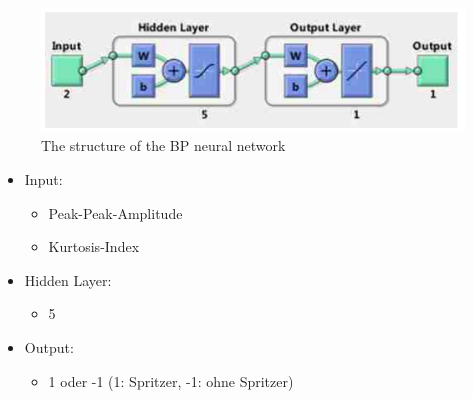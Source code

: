 \documentclass[english,ngerman]{tudscrreprt}
\begin{document}
\begin{figure}[H]
\centering
\includegraphics[scale = 0.8]{./Bilder/The structure of the BP neural network.png}
\caption{The structure of the BP neural network}\label{fgg:Wavelets}
\end{figure}
\begin{itemize}
\item Input:
\begin{itemize}
	\item Peak-Peak-Amplitude 
	\item Kurtosis-Index
\end{itemize}
\item Hidden Layer:
\begin{itemize}
	\item 5
\end{itemize}
\item Output:
\begin{itemize}
	\item 1 oder -1 (1: Spritzer, -1: ohne Spritzer)
\end{itemize}
\end{itemize}
\newpage
\end{document}
